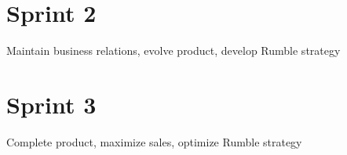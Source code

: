 \documentclass{scrreprt}
\begin{document}

\section{Sprint 2}
Maintain business relations, evolve product, develop Rumble strategy


\section{Sprint 3}
Complete product, maximize sales, optimize Rumble strategy
\end{document}
